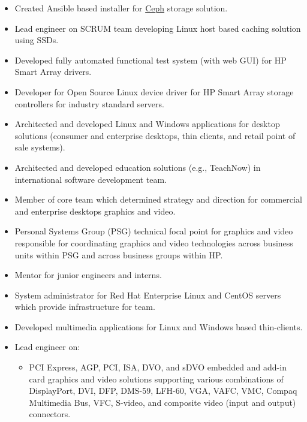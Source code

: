 \documentclass[10pt,letterpaper,oneside]{report}
\begin{document}
\begin{itemize}
  \item Created Ansible based installer for \href{https://ceph.com}{Ceph}
    storage solution.

  \item Lead engineer on SCRUM team developing Linux host based caching
    solution using SSDs.

  \item Developed fully automated functional test system (with web GUI) for HP
    Smart Array drivers.

  \item Developer for Open Source Linux device driver for HP Smart Array
    storage controllers for industry standard servers.

  \item Architected and developed Linux and Windows applications for desktop
    solutions (consumer and enterprise desktops, thin clients, and retail
    point of sale systems).

  \item Architected and developed education solutions (e.g., TeachNow) in
    international software development team.

  \item Member of core team which determined strategy and direction for
    commercial and enterprise desktops graphics and video.

  \item Personal Systems Group (PSG) technical focal point for graphics and
    video responsible for coordinating graphics and video technologies across
    business units within PSG and across business groups within HP.

  \item Mentor for junior engineers and interns.

  \item System administrator for Red Hat Enterprise Linux and CentOS servers
    which provide infrastructure for team.

  \item Developed multimedia applications for Linux and Windows based
    thin-clients.

  \item Lead engineer on:
    \begin {itemize}
      \item PCI Express, AGP, PCI, ISA, DVO, and sDVO embedded and add-in card
        graphics and video solutions supporting various combinations of
        DisplayPort, DVI, DFP, DMS-59, LFH-60, VGA, VAFC, VMC, Compaq Multimedia
        Bus, VFC, S-video, and composite video (input and output) connectors.


\end{itemize}
\end{itemize}
\end{document}
